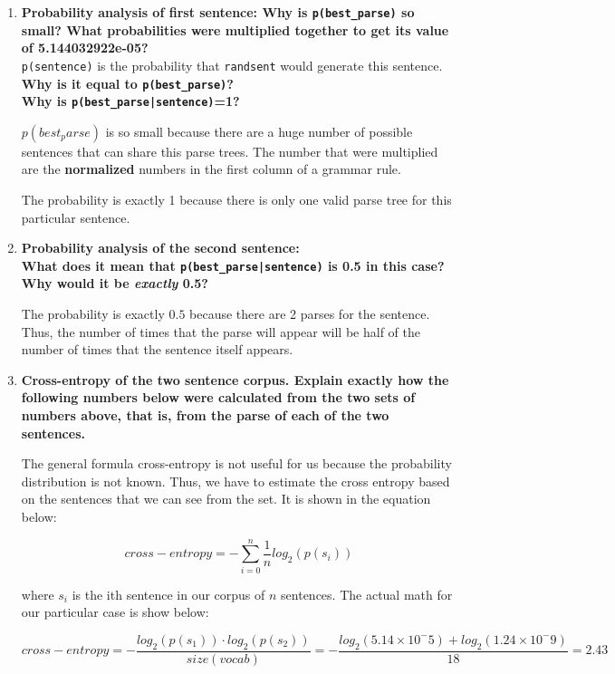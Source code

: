 \documentclass[10pt]{article}
\begin{document}
\begin{enumerate}
\begin{enumerate}
\begin{enumerate} 
\item {\bf Probability analysis of first sentence: Why is \verb|p(best_parse)| so small?  What probabilities were
  multiplied together to get its value of 5.144032922e-05?}\\
\noindent
\verb|p(sentence)| is the probability that \verb|randsent| would
  generate this sentence. {\bf Why is it equal to \verb|p(best_parse)|?}\\
\noindent
{\bf Why is \verb+p(best_parse|sentence)+=1?}

$p(best_parse)$ is so small because there are a huge number of possible sentences that can share this parse trees. The number that were multiplied are the {\bf normalized} numbers in the first column of a grammar rule.

The probability is exactly 1 because there is only one valid parse tree for this particular sentence.


\item {\bf Probability analysis of the second sentence:  \\
\noindent
What does it mean that \verb+p(best_parse|sentence)+ is 0.5 in this
case? \\
\noindent
Why would it be {\it exactly} 0.5?}


The probability is exactly $0.5$ because there are 2 parses for the sentence. Thus, the number of times that the parse will appear will be half of the number of times that the sentence itself appears.


\item {\bf Cross-entropy of the two sentence corpus. Explain exactly
    how the following numbers below were calculated from the two sets
    of numbers above, that is, from the parse of each of the two
    sentences.}

The general formula cross-entropy is not useful for us because the probability distribution is not known. Thus, we have to estimate the cross entropy based on the sentences that we can see from the set. It is shown in the equation below:

\begin{equation}
cross-entropy = - \sum_{i = 0}^{n} \frac{1}{n} log_2(p(s_i))
\end{equation}

where $s_i$ is the ith sentence in our corpus of $n$ sentences. The actual math for our particular case is show below:

\begin{equation}
cross-entropy = - \frac{log_2(p(s_1)) \cdot log_2(p(s_2))}{size(vocab)} = - \frac{log_2(5.14 \times10^-5) + log_2(1.24 \times 10^-9)}{18} = 2.43
\end{equation}



\end{enumerate}
\end{enumerate}
\end{enumerate}
\end{document}
